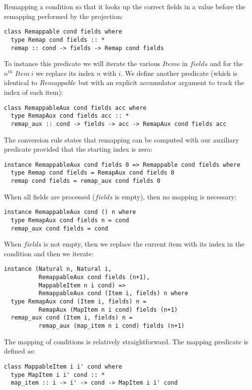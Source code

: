 Remapping a condition so that it looks up the correct fields in a value before the remapping performed by the projection:
\begin{lstlisting}
class Remappable cond fields where
  type Remap cond fields :: *
  remap :: cond -> fields -> Remap cond fields
\end{lstlisting}

To instance this predicate we will iterate the various $Item$s in $fields$ and for the $n^{th}$ $Item\ i$ we replace its index $n$ with $i$. We define another predicate (which is identical to $Remappable$ but with an explicit accumulator argument to track the index of each item):
\begin{lstlisting}
class RemappableAux cond fields acc where
  type RemapAux cond fields acc :: *
  remap_aux :: cond -> fields -> acc -> RemapAux cond fields acc  
\end{lstlisting}

The conversion rule states that remapping can be computed with our auxiliary predicate provided that the starting index is zero:
\begin{lstlisting}
instance RemappableAux cond fields 0 => Remappable cond fields where
  type Remap cond fields = RemapAux cond fields 0
  remap cond fields = remap_aux cond fields 0
\end{lstlisting}

When all fields are processed ($fields$ is empty), then no mapping is necessary:
\begin{lstlisting}
instance RemappableAux cond () n where
  type RemapAux cond fields n = cond
  remap_aux cond fields = cond
\end{lstlisting}

When $fields$ is not empty, then we replace the current item with its index in the condition and then we iterate:
\begin{lstlisting}
instance (Natural n, Natural i,
          RemappableAux cond fields (n+1),
          MappableItem n i cond) =>
          RemappableAux cond (Item i, fields) n where
  type RemapAux cond (Item i, fields) n = 
          RemapAux (MapItem n i cond) fields (n+1)
  remap_aux cond (Item i, fields) n = 
          remap_aux (map_item n i cond) fields (n+1)
\end{lstlisting}

The mapping of conditions is relatively straightforward. The mapping predicate is defined as:
\begin{lstlisting}
class MappableItem i i' cond where
  type MapItem i i' cond :: *
  map_item :: i -> i' -> cond -> MapItem i i' cond
\end{lstlisting}

